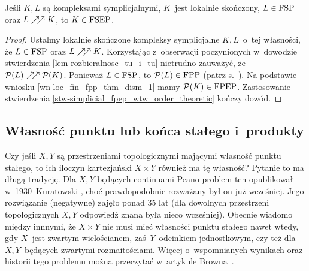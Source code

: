 \begin{wn}\label{tw-loc_fin_fpp_thm_dism_1_simplicial}
Jeśli $K,L$ są kompleksami symplicjalnymi, $K$~jest lokalnie skończony, $L\in\mathrm{FSP}$ oraz ${L\nearrow\!\!\nearrow K}$, to $K\in\mathrm{FSEP}$.
\end{wn}
\begin{proof}
Ustalmy lokalnie skończone kompleksy symplicjalne $K,L$~o~tej własności, że $L\in \mathrm{FSP}$ oraz $L\nearrow\!\!\nearrow K$. Korzystając z~obserwacji poczynionych w~dowodzie stwierdzenia \ref{lem-rozbieralnosc_tu_i_tu} nietrudno zauważyć, że $\mathcal{P}(L)\nearrow\!\!\nearrow \mathcal{P}(K)$. Ponieważ $L\in \mathrm{FSP}$, to $\mathcal{P}(L)\in\mathrm{FPP}$ (patrz s.~\pageref{schroder-fsp-wtw-fpp}). Na podstawie wniosku \ref{wn-loc_fin_fpp_thm_dism_1} mamy  $\mathcal{P}(K)\in\mathrm{FPEP}$. Zastosowanie stwierdzenia \ref{stw-simplicial_fpep_wtw_order_theoretic} kończy dowód.
\end{proof}






\subsection{Własność punktu lub końca stałego i~produkty}
Czy jeśli $X,Y$ są przestrzeniami topologicznymi mającymi własność punktu stałego, to ich iloczyn kartezjański $X\times Y$ również ma tę własność? Pytanie to ma długą tradycję. Dla $X,Y$ będących continuami Peano problem ten opublikował w~1930~Kuratowski \cite{Kuratowski30}, choć prawdopodobnie rozważany był on już wcześniej. Jego rozwiązanie (negatywne) zajęło ponad 35 lat (dla dowolnych przestrzeni topologicznych $X,Y$ odpowiedź znana była nieco wcześniej). Obecnie wiadomo między innnymi, że $X\times Y$ nie musi mieć własności punktu stałego nawet wtedy, gdy $X$~jest zwartym wielościanem, zaś~$Y$~odcinkiem jednostkowym, czy też dla $X,Y$~będących zwartymi rozmaitościami. Więcej o~wspomnianych wynikach oraz historii tego problemu można przeczytać w~artykule Browna~\cite{Brown82}.

